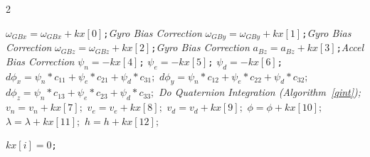 \documentclass[journal]{IEEEtran}
\begin{document}
\begin{tcolorbox}[float*=!tbph]
\begin{algorithm}[H]
\begin{multicols}{2}
\begin{algorithmic}[1]
\EndFunction

\State \texttt{$\omega_{GBx}=\omega_{GBx}+kx[0]$;}\Comment\textit{Gyro Bias Correction}
\State \texttt{$\omega_{GBy}=\omega_{GBy}+kx[1]$;}\Comment\textit{Gyro Bias Correction}
\State \texttt{$\omega_{GBz}=\omega_{GBz}+kx[2]$;}\Comment\textit{Gyro Bias Correction}
\State \texttt{$a_{Bz}=a_{Bz}+kx[3]$;}\Comment\textit{Accel Bias Correction}
\State \texttt{$\psi_n=-kx[4]$;}
\State \texttt{$\psi_e=-kx[5]$;}
\State \texttt{$\psi_d=-kx[6]$;}
\State \texttt{$d\phi_x = \psi_n * c_{11} + \psi_e * c_{21} +\psi_d* c_{31};$}
\State \texttt{$d\phi_y = \psi_n * c_{12} + \psi_e * c_{22} +\psi_d* c_{32};$}
\State \texttt{$d\phi_z = \psi_n * c_{13} + \psi_e * c_{23} +\psi_d* c_{33};$}
\State \textit{Do Quaternion Integration (Algorithm~\ref{qint});}
\State \texttt{$v_n = v_n + kx[7];$}  
\State \texttt{$v_e = v_e + kx[8];$}
\State \texttt{$v_d = v_d + kx[9];$}
\State \texttt{$\phi = \phi + kx[10];$}  
\State \texttt{$\lambda = \lambda + kx[11];$}
\State \texttt{$h = h + kx[12];$}

\EndFunction


 
        \State \texttt{$kx[i] = 0$;}
      \EndFor
    

\EndFunction


\end{algorithmic}
\end{multicols}
\label{inter4}
\end{algorithm}

\end{tcolorbox}












%
%
\end{document}

